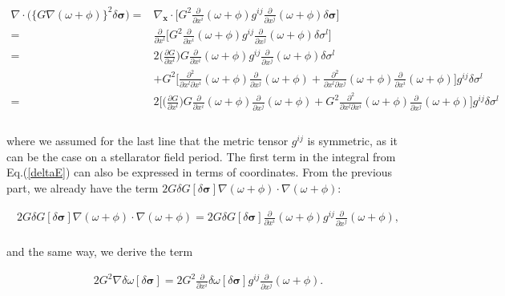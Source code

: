 \documentclass[aps,prc,floatfix,showkeys,nofootinbib]{revtex4-1}
\newcommand{\beq}{\begin{equation}}
\newcommand{\eeq}{\end{equation}}
\newcommand{\Div}{\nabla\cdot}
\newcommand{\grad}{\nabla}
\begin{document}
\beq
\begin{split}
\Div \Big(\{G\grad (\omega + \phi)\}^2 \delta \bm{\sigma}\Big) =& \nabla_{\mathbf{x}}\cdot \Big[G^2 \frac{\partial}{\partial x^{i}}(\omega + \phi)g^{ij}\frac{\partial}{\partial x^{j}}(\omega + \phi)  \delta \bm{\sigma}\Big] \\
=&\frac{\partial}{\partial x^{l}}\Big[G^2 \frac{\partial}{\partial x^{i}}(\omega + \phi)g^{ij}\frac{\partial}{\partial x^{j}}(\omega + \phi) \delta \sigma^{l}\Big]\\
=& 2 \Big( \frac{\partial G}{\partial x^{l}}\Big)G\frac{\partial}{\partial x^{i}}(\omega + \phi)g^{ij}\frac{\partial}{\partial x^{j}}(\omega + \phi) \delta \sigma^{l}\\
&+ G^2\Big[ \frac{\partial^2}{\partial x^{l}\partial x^{i}}(\omega + \phi) \frac{\partial}{\partial x^{j}}(\omega + \phi) + \frac{\partial^2}{\partial x^{l}\partial x^{j}}(\omega + \phi) \frac{\partial}{\partial x^{i}}(\omega + \phi) \Big]g^{ij}\delta \sigma^{l}\\
=& 2\Bigg[ \Big( \frac{\partial G}{\partial x^{l}}\Big)G\frac{\partial}{\partial x^{i}}(\omega + \phi)\frac{\partial}{\partial x^{j}}(\omega + \phi) + G^2\frac{\partial^2}{\partial x^{l}\partial x^{i}}(\omega + \phi) \frac{\partial}{\partial x^{j}}(\omega + \phi)\Bigg]g^{ij}\delta \sigma^{l}\\
\end{split}
\eeq\\

\noindent where we assumed for the last line that the metric tensor $g^{ij}$ is symmetric, as it can be the case on a stellarator field period. The first term in the integral from Eq.(\ref{deltaE}) can also be expressed in terms of coordinates. From the previous part, we already have the term $2 G\delta G[\delta \bm{\sigma}] \nabla(\omega + \phi) \cdot \nabla(\omega + \phi)$: 

\beq
\begin{split}
2G\delta G[\delta \bm{\sigma}] \nabla(\omega + \phi) \cdot \nabla(\omega + \phi) =  2G \delta G[\delta \bm{\sigma}]\frac{\partial}{\partial x^{i}}(\omega + \phi)g^{ij}\frac{\partial}{\partial x^{j}}(\omega + \phi),
\end{split}
\eeq\\

\noindent and the same way, we derive the term 

\beq
\begin{split}
2G^2\nabla \delta \omega[\delta \bm{\sigma}] = 2 G^2 \frac{\partial }{\partial x^{i}}\delta \omega[\delta \bm{\sigma}]g^{ij}\frac{\partial}{\partial x^{j}}(\omega + \phi).
\end{split}
\eeq\\
\end{document}
